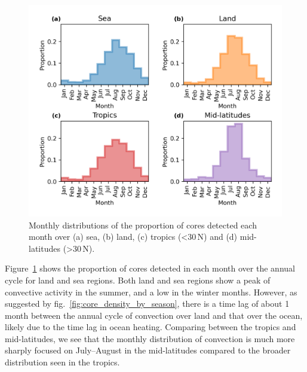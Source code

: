\begin{figure}[tp]
    \centering
    \includegraphics[width=\textwidth]{figures/chapter2_04.png}
    \caption[
    Monthly distributions of the proportion of cores detected each month over land, sea, tropics and mid-latitudes
    ]{
    Monthly distributions of the proportion of cores detected each month over (a) sea, (b) land, (c) tropics (\textless 30\,\textdegree N) and (d) mid-latitudes (\textgreater 30\,\textdegree N).
    }
    \label{fig:core_annual_land_sea}
\end{figure}


Figure~\ref{fig:core_annual_land_sea} shows the proportion of cores detected in each month over the annual cycle for land and sea regions.
Both land and sea regions show a peak of convective activity in the summer, and a low in the winter months.
However, as suggested by fig.~\ref{fig:core_density_by_season}, there is a time lag of about 1 month between the annual cycle of convection over land and that over the ocean, likely due to the time lag in ocean heating.
Comparing between the tropics and mid-latitudes, we see that the monthly distribution of convection is much more sharply focused on July--August in the mid-latitudes compared to the broader distribution seen in the tropics.


